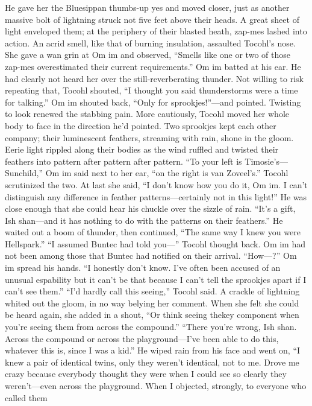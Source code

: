 \documentclass[9pt]{article}
\begin{document}
He gave her the Bluesippan thumbs-up yes and moved closer, just as another massive bolt of
lightning struck not five feet above their heads. A great sheet of light enveloped them; at the periphery of
their blasted heath, zap-mes lashed into action. An acrid smell, like that of burning insulation, assaulted
Tocohl’s nose.
She gave a wan grin at Om im and observed, “Smells like one or two of those zap-mes
overestimated their current requirements.”
Om im batted at his ear. He had clearly not heard her over the still-reverberating thunder.
Not willing to risk repeating that, Tocohl shouted, “I thought you said thunderstorms were a time for
talking.”
Om im shouted back, “Only for sprookjes!”—and pointed.
Twisting to look renewed the stabbing pain. More cautiously, Tocohl moved her whole body to face
in the direction he’d pointed.
Two sprookjes kept each other company; their luminescent feathers, streaming with rain, shone in the
gloom. Eerie light rippled along their bodies as the wind ruffled and twisted their feathers into pattern after
pattern after pattern.
“To your left is Timosie’s—Sunchild,” Om im said next to her ear, “on the right is van Zoveel’s.”
Tocohl scrutinized the two. At last she said, “I don’t know how you do it, Om im. I can’t distinguish
any difference in feather patterns—certainly not in this light!”
He was close enough that she could hear his chuckle over the sizzle of rain. “It’s a gift, Ish shan—and
it has nothing to do with the patterns on their feathers.” He waited out a boom of thunder, then continued,
“The same way I knew you were Hellspark.”
“I assumed Buntec had told you—” Tocohl thought back. Om im had not been among those that
Buntec had notified on their arrival. “How—?”
Om im spread his hands. “I honestly don’t know. I’ve often been accused of an unusual espability
but it can’t be that because I can’t tell the sprookjes apart if I can’t see them.”
“I’d hardly call this seeing,” Tocohl said. A crackle of lightning whited out the gloom, in no way
belying her comment. When she felt she could be heard again, she added in a shout, “Or think seeing thekey component when you’re seeing them from across the compound.”
“There you’re wrong, Ish shan. Across the compound or across the playground—I’ve been able to
do this, whatever this is, since I was a kid.”
He wiped rain from his face and went on, “I knew a pair of identical twins, only they weren’t
identical, not to me. Drove me crazy because everybody thought they were when I could see so clearly
they weren’t—even across the playground. When I objected, strongly, to everyone who called them
\end{document}
